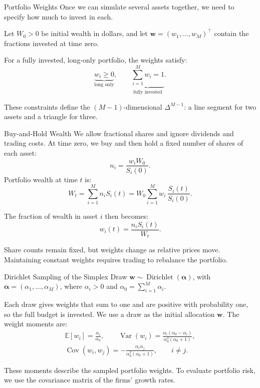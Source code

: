 \documentclass[aspectratio=169,11pt]{beamer}
\newcommand{\E}{\mathbb{E}}
\newcommand{\Var}{\operatorname{Var}}
\newcommand{\Cov}{\operatorname{Cov}}
\newcommand{\bw}{\mathbf{w}}
\begin{document}
\begin{frame}{Portfolio Weights}
  Once we can simulate several assets together, we need to specify how much
  to invest in each.

  \vspace{0.6em}
  Let $W_0>0$ be initial wealth in dollars, and let
  $\bw=(w_1,\ldots,w_M)^{\top}$ contain the fractions invested at time zero.

  \vspace{0.6em}
  For a fully invested, long-only portfolio, the weights satisfy:
  \[
    \underbrace{w_i\ge0}_{\text{long only}},\qquad
    \underbrace{\sum_{i=1}^{M}w_i=1}_{\text{fully invested}}.
  \]

  \vspace{0.4em}
  These constraints define the $(M-1)$-dimensional 
  $\Delta^{M-1}$: a line segment for two assets and a triangle for three.
\end{frame}

\begin{frame}{Buy-and-Hold Wealth}
  We allow fractional shares and ignore dividends and trading costs.
  At time zero, we buy and then hold a fixed number of shares of each asset:
  \[
    n_i=\frac{w_iW_0}{S_i(0)}.
  \]
  Portfolio wealth at time $t$ is:
  \[
    \boxed{W_t=\sum_{i=1}^{M}n_iS_i(t)
      =W_0\sum_{i=1}^{M}w_i\,\frac{S_i(t)}{S_i(0)}.}
  \]

  \vspace{0.4em}
  The fraction of wealth in asset $i$ then becomes:
  \[
    w_i(t)=\frac{n_iS_i(t)}{W_t}.
  \]

  Share counts remain fixed, but weights change as relative prices move.
  Maintaining constant weights requires trading to rebalance the portfolio.
\end{frame}

\begin{frame}{Dirichlet Sampling of the Simplex}
  Draw $\bw\sim\operatorname{Dirichlet}(\boldsymbol\alpha)$, with
   $\boldsymbol\alpha=(\alpha_1,\ldots,\alpha_M)$,
  where $\alpha_i>0$ and $\alpha_0=\sum_{i=1}^{M}\alpha_i$.

  \vspace{0.4em}
  Each draw gives weights that sum to one and are positive with probability one, so the full budget is
  invested. We use a draw as the initial allocation $\bw$. The weight moments are:
  \[
    \begin{gathered}
      \E[w_i]=\frac{\alpha_i}{\alpha_0},\qquad
      \Var(w_i)=\frac{\alpha_i(\alpha_0-\alpha_i)}{\alpha_0^2(\alpha_0+1)},\\[0.5em]
      \Cov(w_i,w_j)=-\frac{\alpha_i\alpha_j}{\alpha_0^2(\alpha_0+1)},\qquad i\ne j.
    \end{gathered}
  \]

  These moments describe the sampled portfolio weights. To evaluate
  portfolio risk, we use the covariance matrix of the firms' growth rates.
\end{frame}
\end{document}
